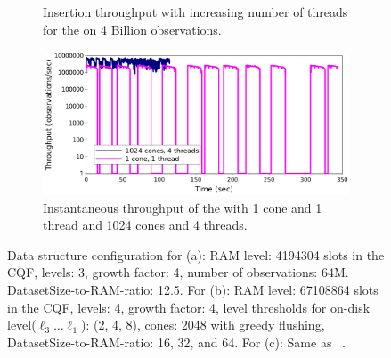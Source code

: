 \begin{figure}
{\begin{subfigure}{0.32\linewidth}
  {\centering
  }
  \caption{Insertion throughput with increasing number of threads for the
    \cs on 4 Billion observations. }
    \label{fig:time-threads-pf}
\end{subfigure}
%
\hfill
\begin{subfigure}{0.33\linewidth}
  \centering
  \includegraphics[width=\linewidth]{fig/ThroughputAnalysis.png}
  \caption{Instantaneous throughput of the \cs with 1 cone and 1 thread and 1024
  cones and 4 threads.}
  \label{fig:throughputanalysis}
\end{subfigure}
}
\caption{Data structure configuration for (a): RAM level: 4194304 slots in
    the CQF, levels: 3, growth factor: 4, number of observations: 64M.
    DatasetSize-to-RAM-ratio: 12.5. For (b):
    RAM level: 67108864 slots in the CQF, levels: 4, growth factor: 4, level
    thresholds for on-disk level($\ell_3\ldots\ell_{1}$): (2, 4, 8), cones: 2048
    with greedy flushing, DatasetSize-to-RAM-ratio: 16, 32, and 64. For (c):
    Same as ~.}
\end{figure}




